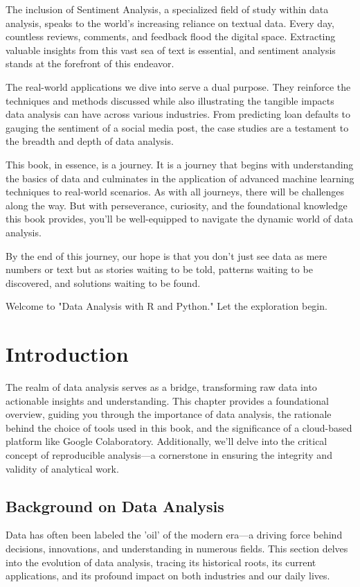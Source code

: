 \documentclass{book}
\begin{document}
The inclusion of Sentiment Analysis, a specialized field of study within data analysis, speaks to the world's increasing reliance on textual data. Every day, countless reviews, comments, and feedback flood the digital space. Extracting valuable insights from this vast sea of text is essential, and sentiment analysis stands at the forefront of this endeavor.

The real-world applications we dive into serve a dual purpose. They reinforce the techniques and methods discussed while also illustrating the tangible impacts data analysis can have across various industries. From predicting loan defaults to gauging the sentiment of a social media post, the case studies are a testament to the breadth and depth of data analysis.

This book, in essence, is a journey. It is a journey that begins with understanding the basics of data and culminates in the application of advanced machine learning techniques to real-world scenarios. As with all journeys, there will be challenges along the way. But with perseverance, curiosity, and the foundational knowledge this book provides, you'll be well-equipped to navigate the dynamic world of data analysis.

By the end of this journey, our hope is that you don't just see data as mere numbers or text but as stories waiting to be told, patterns waiting to be discovered, and solutions waiting to be found.

Welcome to "Data Analysis with R and Python." Let the exploration begin.

\chapter{Introduction}
The realm of data analysis serves as a bridge, transforming raw data into actionable insights and understanding. This chapter provides a foundational overview, guiding you through the importance of data analysis, the rationale behind the choice of tools used in this book, and the significance of a cloud-based platform like Google Colaboratory. Additionally, we'll delve into the critical concept of reproducible analysis—a cornerstone in ensuring the integrity and validity of analytical work.

\section{Background on Data Analysis}
Data has often been labeled the 'oil' of the modern era—a driving force behind decisions, innovations, and understanding in numerous fields. This section delves into the evolution of data analysis, tracing its historical roots, its current applications, and its profound impact on both industries and our daily lives.
\end{document}
